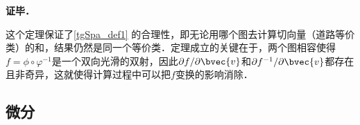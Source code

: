 \textbf{证毕．}

这个定理保证了\autoref{tgSpa_def1} 的合理性，即无论用哪个图去计算切向量（道路等价类）的和，结果仍然是同一个等价类．定理成立的关键在于，两个图相容使得$f=\phi\circ\varphi^{-1}$是一个双向光滑的双射，因此$\partial f/\partial\bvec{v}$和$\partial f^{-1}/\partial\bvec{v}$都存在且非奇异，这就使得计算过程中可以把$f$变换的影响消除．

\subsection{微分}





